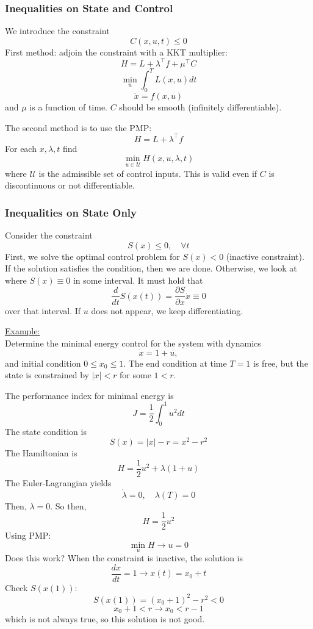 \documentclass{article}
\begin{document}
\subsubsection{Inequalities on State and Control}

\noindent
We introduce the constraint
\[C(x,u,t) \le 0\]
First method: adjoin the constraint with a KKT multiplier:
\[H = L + \lambda^\top f + \mu^\top C\]
\[\min_{u}\int_{0}^{T}L(x,u)dt\]
\[\dot{x} = f(x,u)\]
and $\mu$ is a function of time. $C$ should be smooth (infinitely differentiable).

\noindent
The second method is to use the PMP:
\[H = L + \lambda^\top f\]
For each $x,\lambda,t$ find
\[\min_{u\in\mathcal{U}}H(x,u,\lambda,t)\]
where $\mathcal{U}$ is the admissible set of control inputs. This is valid
even if $C$ is discontinuous or not differentiable.

\subsubsection{Inequalities on State Only}

\noindent
Consider the constraint
\[S(x) \le 0, \quad \forall t\]
First, we solve the optimal control problem for $S(x) < 0$ (inactive constraint).
If the solution satisfies the condition, then we are done. Otherwise, we look at
where $S(x) \equiv 0$ in some interval. It must hold that
\[\frac{d}{dt}S(x(t)) = \frac{\partial S}{\partial x}\dot{x} \equiv 0\]
over that interval. If $u$ does not appear, we keep differentiating.

\noindent
\underline{Example:}\\[2mm]
Determine the minimal energy control for the system with dynamics
\[\dot{x} = 1 + u,\]
and initial condition $0 \le x_0 \le 1$.  The end condition at time $T = 1$ is free,
but the state is constrained by $|x| < r$ for some $1 < r$.

\noindent
The performance index for minimal energy is
\[J = \frac{1}{2}\int_{0}^{1}u^2 dt\]
The state condition is
\[S(x) = |x| - r = x^2 - r^2\]
The Hamiltonian is
\[H = \frac{1}{2}u^2 + \lambda(1 + u)\]
The Euler-Lagrangian yields
\[\dot{\lambda} = 0, \quad \lambda(T) = 0\]
Then, $\lambda = 0$. So then,
\[H = \frac{1}{2}u^2\]
Using PMP:
\[\min_{u} H \rightarrow u = 0\]
Does this work? When the constraint is inactive, the solution is
\[\frac{dx}{dt} = 1 \rightarrow x(t) = x_0 + t\]
Check $S(x(1))$:
\[S(x(1)) = (x_0 + 1)^2 - r^2 < 0\]
\[x_0 + 1 < r \rightarrow x_0 < r - 1\]
which is not always true, so this solution is not good.
\end{document}
